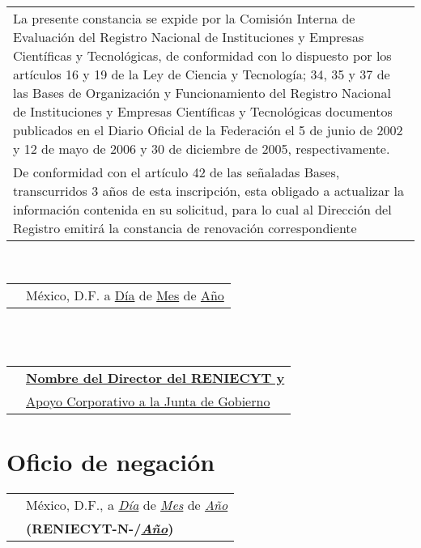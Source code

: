 \begin{center}
\begin{tabular}{ | m{} |}%
\hline
\noindent  \footnotesize La presente constancia se expide  por la Comisión Interna de Evaluación del Registro Nacional de Instituciones y Empresas Científicas y Tecnológicas, de conformidad con lo dispuesto por los artículos 16 y 19 de la Ley de Ciencia y Tecnología; 34, 35 y 37 de las Bases de Organización y Funcionamiento del Registro Nacional de Instituciones y Empresas Científicas y Tecnológicas documentos publicados en el Diario Oficial de la Federación el 5 de junio de 2002 y 12 de mayo de 2006 y 30 de diciembre de 2005, respectivamente.\\

\noindent \footnotesize De conformidad con el artículo 42 de las señaladas Bases, transcurridos 3 años de esta inscripción, esta obligado a actualizar la información contenida en su solicitud, para lo cual al Dirección del Registro emitirá la constancia de renovación correspondiente\\ \hline
\end{tabular}\\
\end{center}

\begin{tabular}{ m{} m{} }%
& México, D.F. a \underline{Día} de \underline{Mes} de \underline{Año} \\
\end{tabular}\\ \\


\begin{tabular}{ m{} m{} }%
& {\bf\underline{Nombre del Director del RENIECYT y }} \\
& \underline{Apoyo Corporativo a la Junta de Gobierno} \\
\end{tabular}




\newpage
\section{Oficio de negación}
\label{appendix:Constancias:ConstanciaNegada}

\begin{tabular}{ m{} m{} }%
& México, D.F., a \underline{{\it Día}} de \underline{{\it Mes}} de \underline{{\it Año}} \\
& {\bf(RENIECYT-N-/\underline{{\it Año}})} \\
\end{tabular}\\ \\

